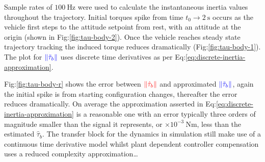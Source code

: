 \par
Sample rates of $100~\text{Hz}$ were used to calculate the instantaneous inertia values throughout the trajectory. Initial torques spike from time $t_0\rightarrow 2~\text{s}$ occurs as the vehicle first steps to the attitude setpoint from rest, with an attitude at the origin (shown in Fig:\ref{fig:tau-body-2}). Once the vehicle reaches steady state trajectory tracking the induced torque reduces dramatically (Fig:\ref{fig:tau-body-1}). The plot for $\color{blue}\left\lVert\tilde{\tau}_b\right\rVert$ uses discrete time derivatives as per Eq:\ref{eq:discrete-inertia-approximation}.
\par
Fig:\ref{fig:tau-body-r} shows the error between $\color{red}\left\lVert\hat{\tau}_b\right\rVert$ and approximated $\color{blue}\left\lVert\tilde{\tau}_b\right\rVert$, again the initial spike is from starting configuration changes, thereafter the error reduces dramatically. On average the approximation asserted in Eq:\ref{eq:discrete-inertia-approximation} is a reasonable one with an error typically three orders of magnitude smaller than the signal it represents, or $\times 10^{-3}~\text{Nm}$, less than the estimated $\hat{\tau}_b$. The transfer block for the dynamics in simulation still make use of a continuous time derivative model whilst plant dependent controller compensation uses a reduced complexity approximation\ldots
